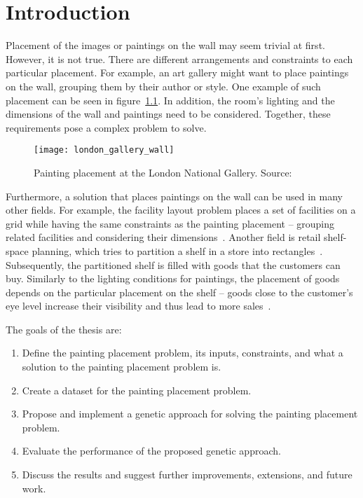 \chapter{Introduction}\label{ch:introduction}

Placement of the images or paintings on the wall may seem trivial at first.
However, it is not true.
There are different arrangements and constraints to each particular placement.
For example, an art gallery might want to place paintings on the wall, grouping them by their author or style.
One example of such placement can be seen in figure~\ref{fig:london-wall}.
In addition, the room's lighting and the dimensions of the wall and paintings need to be considered.
Together, these requirements pose a complex problem to solve.

\begin{figure}[]
    \texttt{[image: london\_gallery\_wall]}
    \caption[Painting placement at the London National Gallery]{Painting placement at the London National Gallery. Source:~\cite{ScreenshotWallGoogle}}
    \label{fig:london-wall}
\end{figure}


Furthermore, a solution that places paintings on the wall can be used in many other fields.
For example, the facility layout problem places a set of facilities on a grid
while having the same constraints as the painting placement – grouping related facilities and considering their dimensions~\cite{goncalvesBiasedRandomkeyGenetic2015}.
Another field is retail shelf-space planning, which tries to partition a shelf in a store into rectangles~\cite{yangStudyShelfSpace1999}.
Subsequently, the partitioned shelf is filled with goods that the customers can buy.
Similarly to the lighting conditions for paintings, the placement of goods depends on the
particular placement on the shelf – goods close to the customer's eye level increase their visibility and thus lead to more sales~\cite{hwangGeneticAlgorithmApproach2009}.

The goals of the thesis are:

\begin{enumerate}
    \item Define the painting placement problem, its inputs, constraints, and what a solution to the painting placement problem is.
    \item Create a dataset for the painting placement problem.
    \item Propose and implement a genetic approach for solving the painting placement problem.
    \item Evaluate the performance of the proposed genetic approach.
    \item Discuss the results and suggest further improvements, extensions, and future work.
\end{enumerate}

